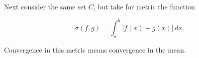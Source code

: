 Next consider the same set $C$, but take for metric the function

$$\sigma(f, g) = \int_a^b |f(x) - g(x)| \, dx.$$

Convergence in this metric means convergence in the mean.
